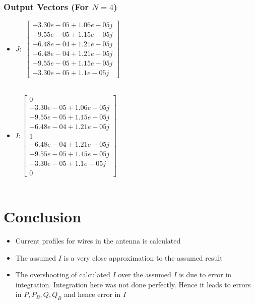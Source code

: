 \documentclass[12pt, a4paper]{article}
\begin{document}
\subsubsection{Output Vectors (For $N=4$)}
\begin{itemize}
    \item $ J :$
    $ 
    \begin{bmatrix}
        -3.30e-05+1.06e-05j \\ -9.55e-05+1.15e-05j \\ -6.48e-04+1.21e-05j \\ -6.48e-04+1.21e-05j \\ -9.55e-05+1.15e-05j \\ -3.30e-05+1.1e-05j
    \end{bmatrix}
    $ \\ \\
\item $ I : 
    \begin{bmatrix}
        0 \\ -3.30e-05+1.06e-05j \\ -9.55e-05+1.15e-05j \\ -6.48e-04+1.21e-05j \\  1 \\ -6.48e-04+1.21e-05j \\ -9.55e-05+1.15e-05j  \\ -3.30e-05+1.1e-05j \\ 0
    \end{bmatrix}
    $ \\ \\ 
\end{itemize}
\section{Conclusion}
\begin{itemize}
    \item Current profiles for wires in the antenna is calculated
    \item The assumed $I$ is a very close approximation to the assumed result
    \item The overshooting of calculated $I$ over the assumed $I$ is due to error in integration. Integration here was not done perfectly. Hence it leads to errors in $P,P_{B},Q,Q_{B}$ and hence error in $I$
\end{itemize}
\end{document}
